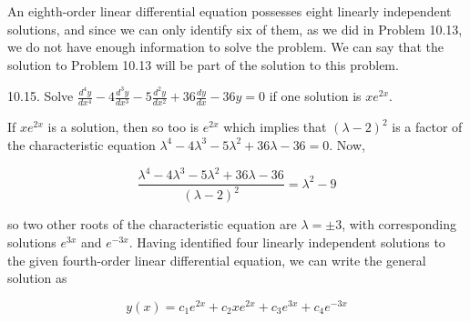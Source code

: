 \documentclass[10pt]{article}
\begin{document}
An eighth-order linear differential equation possesses eight linearly independent solutions, and since we can only identify six of them, as we did in Problem 10.13, we do not have enough information to solve the problem. We can say that the solution to Problem 10.13 will be part of the solution to this problem.

10.15. Solve $\frac{d^{4} y}{d x^{4}}-4 \frac{d^{3} y}{d x^{3}}-5 \frac{d^{2} y}{d x^{2}}+36 \frac{d y}{d x}-36 y=0$ if one solution is $x e^{2 x}$.

If $x e^{2 x}$ is a solution, then so too is $e^{2 x}$ which implies that $(\lambda-2)^{2}$ is a factor of the characteristic equation $\lambda^{4}-4 \lambda^{3}-5 \lambda^{2}+36 \lambda-36=0$. Now,

$$
\frac{\lambda^{4}-4 \lambda^{3}-5 \lambda^{2}+36 \lambda-36}{(\lambda-2)^{2}}=\lambda^{2}-9
$$

so two other roots of the characteristic equation are $\lambda= \pm 3$, with corresponding solutions $e^{3 x}$ and $e^{-3 x}$. Having identified four linearly independent solutions to the given fourth-order linear differential equation, we can write the general solution as

$$
y(x)=c_{1} e^{2 x}+c_{2} x e^{2 x}+c_{3} e^{3 x}+c_{4} e^{-3 x}
$$
\end{document}
